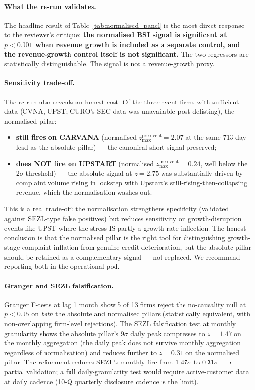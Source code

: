 \documentclass[11pt,a4paper]{article}
\begin{document}
\paragraph{What the re-run validates.} The headline result of Table~\ref{tab:normalised_panel} is the most direct response to the reviewer's critique: \textbf{the normalised BSI signal is significant at $p < 0.001$ when revenue growth is included as a separate control, and the revenue-growth control itself is not significant.} The two regressors are statistically distinguishable. The signal is not a revenue-growth proxy.

\paragraph{Sensitivity trade-off.} The re-run also reveals an honest cost. Of the three event firms with sufficient data (CVNA, UPST; CURO's SEC data was unavailable post-delisting), the normalised pillar:
\begin{itemize}
\item \textbf{still fires on CARVANA} (normalised $z_{\max}^{\text{pre-event}} = 2.07$ at the same 713-day lead as the absolute pillar) --- the canonical short signal preserved;
\item \textbf{does NOT fire on UPSTART} (normalised $z_{\max}^{\text{pre-event}} = 0.24$, well below the 2$\sigma$ threshold) --- the absolute signal at $z = 2.75$ was substantially driven by complaint volume rising in lockstep with Upstart's still-rising-then-collapsing revenue, which the normalisation washes out.
\end{itemize}
This is a real trade-off: the normalisation strengthens specificity (validated against SEZL-type false positives) but reduces sensitivity on growth-disruption events like UPST where the stress IS partly a growth-rate inflection. The honest conclusion is that the normalised pillar is the right tool for distinguishing growth-stage complaint inflation from genuine credit deterioration, but the absolute pillar should be retained as a complementary signal --- not replaced. We recommend reporting both in the operational pod.

\paragraph{Granger and SEZL falsification.} Granger F-tests at lag 1 month show 5 of 13 firms reject the no-causality null at $p < 0.05$ on \emph{both} the absolute and normalised pillars (statistically equivalent, with non-overlapping firm-level rejections). The SEZL falsification test at monthly granularity shows the absolute pillar's 9$\sigma$ daily peak compresses to $z = 1.47$ on the monthly aggregation (the daily peak does not survive monthly aggregation regardless of normalisation) and reduces further to $z = 0.31$ on the normalised pillar. The refinement reduces SEZL's monthly fire from $1.47\sigma$ to $0.31\sigma$ --- a partial validation; a full daily-granularity test would require active-customer data at daily cadence (10-Q quarterly disclosure cadence is the limit).
\end{document}
